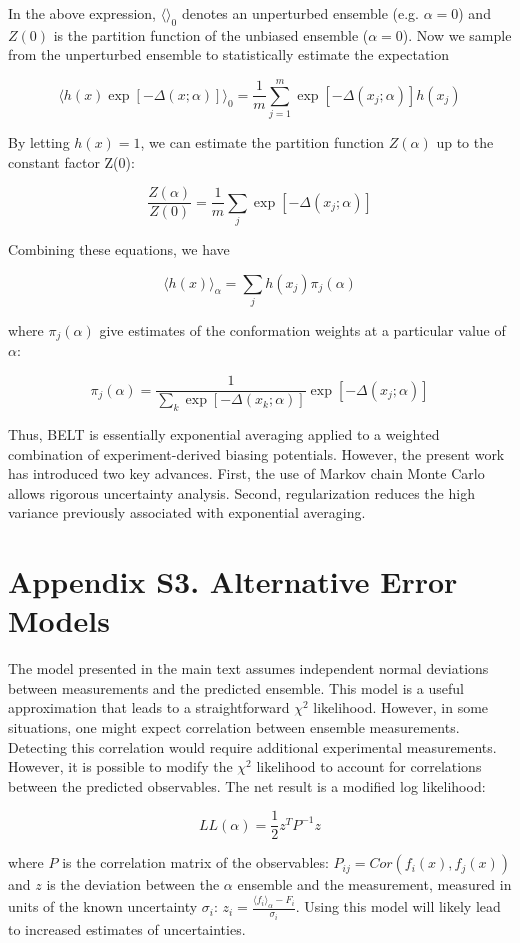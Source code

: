 \documentclass[12pt]{article}
\begin{document}
In the above expression, $\langle \rangle_0$ denotes an unperturbed ensemble (e.g. $\alpha = 0$) and $Z(0)$ is the partition function of the unbiased ensemble ($\alpha = 0$).  Now we sample from the unperturbed ensemble to statistically estimate the expectation

$$\langle h(x) \exp[-\Delta(x;\alpha)]\rangle _0 = \frac{1}{m} \sum_{j = 1}^{m} \exp [ - \Delta(x_j;\alpha)] h(x_j)$$

By letting $h(x) = 1$, we can estimate the partition function $Z(\alpha)$ up to the constant factor Z(0):

$$ \frac{Z(\alpha)}{Z(0)} = \frac{1}{m} \sum_j \exp[-\Delta(x_j;\alpha)]$$

Combining these equations, we have

$$\langle h(x)\rangle _\alpha = \sum_j h(x_j) \pi_j(\alpha)$$

where $\pi_j(\alpha)$ give estimates of the conformation weights at a particular value of $\alpha$:

$$\pi_j(\alpha) = \frac{1}{\sum_k \exp[-\Delta(x_k;\alpha)]} \exp[-\Delta(x_j;\alpha)]$$

Thus, BELT is essentially exponential averaging applied to a weighted combination of experiment-derived biasing potentials.  However, the present work has introduced two key advances.  First, the use of Markov chain Monte Carlo allows rigorous uncertainty analysis.  Second, regularization reduces the high variance previously associated with exponential averaging.  

\newpage

\section*{Appendix S3.  Alternative Error Models}

The model presented in the main text assumes independent normal deviations between measurements and the predicted ensemble.  This model is a useful approximation that leads to a straightforward $\chi^2$ likelihood.  However, in some situations, one might expect correlation between ensemble measurements.  Detecting this correlation would require additional experimental measurements.  However, it is possible to modify the $\chi^2$ likelihood to account for correlations between the predicted observables.  The net result is a modified log likelihood:

$$L L(\alpha) = \frac{1}{2} z^T P^{-1} z$$

where $P$ is the correlation matrix of the observables: $P_{ij} = Cor(f_i(x), f_j(x))$ and $z$ is the deviation between the $\alpha$ ensemble and the measurement, measured in units of the known uncertainty $\sigma_i$: $z_i = \frac{\langle f_i\rangle _\alpha - F_i}{\sigma_i}$.  Using this model will likely lead to increased estimates of uncertainties.  
\end{document}
